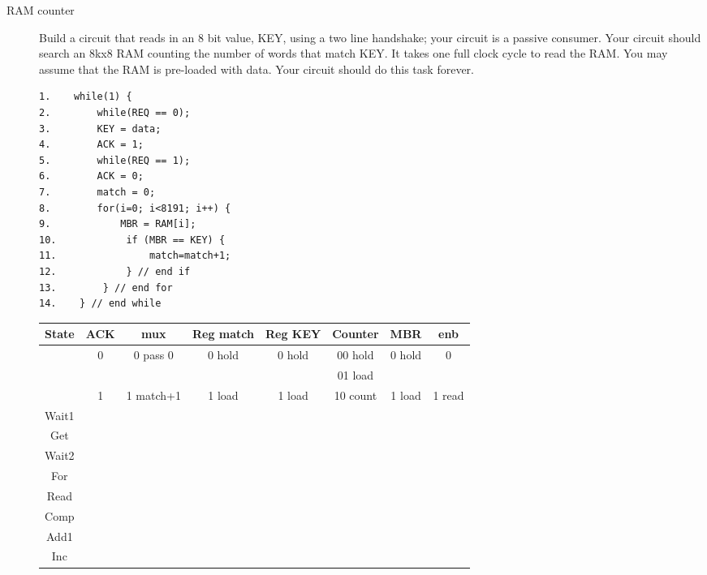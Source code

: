 \begin{description}
        \pagebreak

    \item[RAM counter]
        Build a circuit that reads in an 8 bit value, KEY, using a two
        line handshake; your circuit is a passive consumer.
        Your circuit should search an 8kx8 RAM counting the number
        of words that match KEY.  It takes one full clock cycle
        to read the RAM.  You may assume that the RAM is pre-loaded
        with data.  Your circuit should do this task forever.

\begin{verbatim}
1.    while(1) {
2.        while(REQ == 0);
3.        KEY = data;
4.        ACK = 1;
5.        while(REQ == 1);
6.        ACK = 0;
7.        match = 0;
8.        for(i=0; i<8191; i++) {
9.            MBR = RAM[i];
10.            if (MBR == KEY) {
11.                match=match+1;
12.            } // end if
13.        } // end for
14.    } // end while
\end{verbatim}


        {\tiny
            \begin{tabular}{c||c|c|c|c|c|c|c}
                State   & ACK   & mux       &  Reg match& Reg KEY & Counter     & MBR    & enb             \\ \hline
                & 0     & 0 pass 0  &  0 hold   & 0 hold  & 00 hold     & 0 hold & 0      \\ \hline
                &       &           &           &         & 01 load     &        &               \\ \hline
                & 1     & 1 match+1 &  1 load   & 1 load  & 10 count    & 1 load & 1 read  \\ \hline \hline
                Wait1   &      &          &          &        &           &       &               \\ \hline
                Get     &      &          &          &        &           &       &             \\ \hline
                Wait2   &      &          &          &        &           &       &             \\ \hline
                For     &      &          &          &        &           &       &           \\ \hline
                Read    &      &          &          &        &           &       &             \\ \hline
                Comp    &      &          &          &        &           &       &             \\ \hline
                Add1    &      &          &          &        &           &       &        \\ \hline
                Inc     &      &          &          &        &           &       &            \\
        \end{tabular} }


\end{description}
